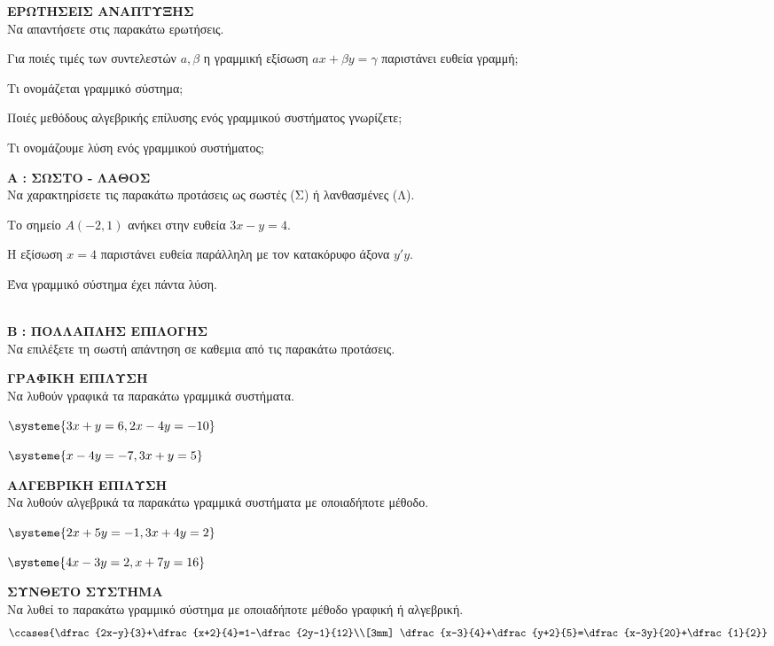 \documentclass[internet]{diag-xelatex}
\begin{document}
\thewria
\begin{thema}
\item \textbf{ΕΡΩΤΗΣΕΙΣ ΑΝΑΠΤΥΞΗΣ}\\
Να απαντήσετε στις παρακάτω ερωτήσεις.
\begin{rlist}
\item Για ποιές τιμές των συντελεστών $ a,\beta $ η γραμμική εξίσωση $ ax+\beta y=\gamma $ παριστάνει ευθεία γραμμή;
\item Τι ονομάζεται γραμμικό σύστημα;
\item Ποιές μεθόδους αλγεβρικής επίλυσης ενός γραμμικού συστήματος γνωρίζετε;
\item Τι ονομάζουμε λύση ενός γραμμικού συστήματος;
\end{rlist}
\item \textbf{A : ΣΩΣΤΟ - ΛΑΘΟΣ}\\
Να χαρακτηρίσετε τις παρακάτω προτάσεις ως σωστές (Σ) ή λανθασμένες (Λ).
\begin{rlist}
\item Το σημείο $ A(-2,1) $ ανήκει στην ευθεία $ 3x-y=4 $.
\item Η εξίσωση $ x=4 $ παριστάνει ευθεία παράλληλη με τον κατακόρυφο άξονα $ y'y $.
\item Ένα γραμμικό σύστημα έχει πάντα λύση.
\item 
\end{rlist}\\
\textbf{Β : ΠΟΛΛΑΠΛΗΣ ΕΠΙΛΟΓΗΣ}\\
Να επιλέξετε τη σωστή απάντηση σε καθεμια από τις παρακάτω προτάσεις.
\end{thema}
\newpage
\noindent
\askhseis
\begin{thema}
\item \textbf{ΓΡΑΦΙΚΗ ΕΠΙΛΥΣΗ}\\
Να λυθούν γραφικά τα παρακάτω γραμμικά συστήματα.
\begin{multicols}{2}
\begin{rlist}
\item $ \systeme{3x+y=6,2x-4y=-10} $
\item $ \systeme{x-4y=-7,3x+y=5} $
\end{rlist}
\end{multicols}
\item \textbf{ΑΛΓΕΒΡΙΚΗ ΕΠΙΛΥΣΗ}\\
Να λυθούν αλγεβρικά τα παρακάτω γραμμικά συστήματα με οποιαδήποτε μέθοδο.
\begin{multicols}{2}
\begin{rlist}
\item $ \systeme{2x+5y=-1,3x+4y=2} $
\item $ \systeme{4x-3y=2,x+7y=16} $
\end{rlist}
\end{multicols}
\item \textbf{ΣΥΝΘΕΤΟ ΣΥΣΤΗΜΑ}\\
Να λυθεί το παρακάτω γραμμικό σύστημα με οποιαδήποτε μέθοδο γραφική ή αλγεβρική.
\[ \ccases{\dfrac{2x-y}{3}+\dfrac{x+2}{4}=1-\dfrac{2y-1}{12}\\[3mm]
\dfrac{x-3}{4}+\dfrac{y+2}{5}=\dfrac{x-3y}{20}+\dfrac{1}{2}} \]
\end{thema}
\kaliepityxia
\end{document}
